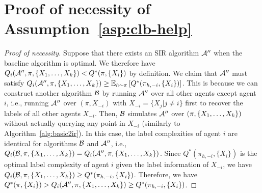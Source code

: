 \section{Proof of necessity of Assumption~\ref{asp:clb-help}}\label{app:nece-asp}
\begin{proof}[Proof of necessity]
Suppose that there exists an SIR algorithm $\mathcal{A}''$ when the baseline algorithm is optimal. We therefore have 
$Q_i(\mathcal{A}'',\pi,\{X_1,\ldots,X_k\}) < Q^*(\pi,\{X_i\})$ by definition.  
We claim that $\mathcal{A}''$ must satisfy $Q_i(\mathcal{A}'',\pi,\{X_1,\ldots,X_k\}) \geq \mathbb{E}_{h\sim \pi}\left[Q^*(\pi_{h,-i}, \{X_i\})\right]$.
This is because we can construct another algorithm $\mathcal{B}$ by running $\mathcal{A}''$ over all other agents except agent $i$, i.e., running $\mathcal{A}''$ over $(\pi, X_{-i})$ with $X_{-i}= \{X_j|j\neq i\}$ first to recover the labels of all other agents $X_{-i}$.
Then, $\mathcal{B}$ simulates $\mathcal{A}''$ over $(\pi, \{X_1,\ldots,X_k\})$ without actually querying any point in $X_{-i}$ (similarly to Algorithm~\ref{alg:basic2ir}).
In this case, the label complexities of agent $i$ are identical for algorithms $\mathcal{B}$ and $\mathcal{A}''$, i.e., $Q_i(\mathcal{B},\pi,\{X_1,\ldots,X_k\})= Q_i(\mathcal{A}'',\pi,\{X_1,\ldots,X_k\})$. 
Since $Q^*(\pi_{h,-i}, \{X_i\})$ is the optimal label complexity of agent $i$ given the label information of $X_{-i}$, we have $Q_i(\mathcal{B},\pi,\{X_1,\ldots,X_k\}) \geq Q^*(\pi_{h,-i}, \{X_i\})$.
Therefore, we have $Q^*(\pi,\{X_i\}) > Q_i(\mathcal{A}'',\pi,\{X_1,\ldots,X_k\})\geq Q^*(\pi_{h,-i}, \{X_i\})$.
\end{proof}